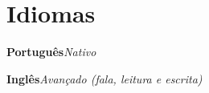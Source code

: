 \section{Idiomas}
\resumeSubHeadingListStart

    \resumeProjectHeading
    {\textbf{Português}}{\emph{Nativo}}

    \resumeProjectHeading
    {\textbf{Inglês}}{\emph{Avançado (fala, leitura e escrita)}}

\resumeSubHeadingListEnd
